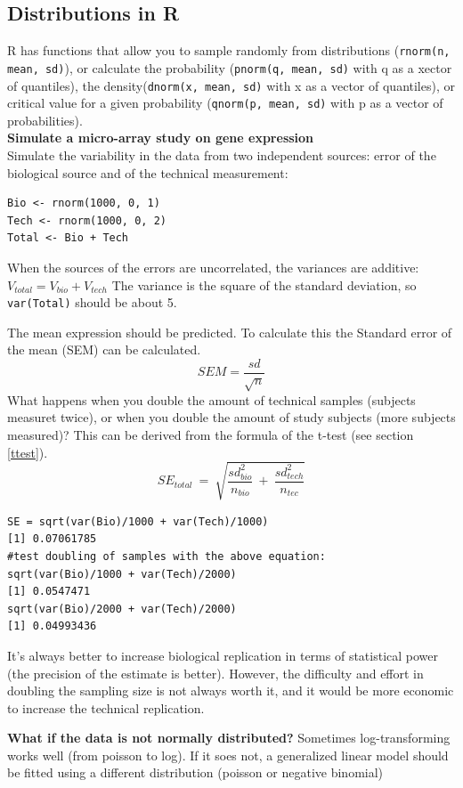 \documentclass{article}
\begin{document}
\subsection{Distributions in R}
R has functions that allow you to sample randomly from distributions (\texttt{rnorm(n, mean, sd)}), or calculate the probability (\texttt{pnorm(q, mean, sd)} with q as a xector of quantiles), the density(\texttt{dnorm(x, mean, sd)} with x as a vector of quantiles), or critical value for a given probability (\texttt{qnorm(p, mean, sd)} with p as a vector of probabilities).\\
\textbf{Simulate a micro-array study on gene expression}\\
Simulate the variability in the data from two independent sources: error of the biological source and of the technical measurement:
\begin{lstlisting}
Bio <- rnorm(1000, 0, 1)
Tech <- rnorm(1000, 0, 2)
Total <- Bio + Tech
\end{lstlisting}
When the sources of the errors are uncorrelated, the variances are additive: $V_{total} = V_{bio} +V_{tech}$
The variance is the square of the standard deviation, so \texttt{var(Total)} should be about 5.\par
The mean expression should be predicted. To calculate this the Standard error of the mean (SEM) can be calculated. $$SEM = \frac{sd}{\sqrt{n}}$$
What happens when you double the amount of technical samples (subjects measuret twice), or when you double the amount of study subjects (more subjects measured)? This can be derived from the formula of the t-test (see section \ref{ttest}). 
$$SE_{total}\: = \:\sqrt{\frac{sd_{bio}^2}{n_{bio}} \: + \: \frac{sd_{tech}^2}{n_{tec}}} $$
\begin{lstlisting}
SE = sqrt(var(Bio)/1000 + var(Tech)/1000)
[1] 0.07061785
#test doubling of samples with the above equation:
sqrt(var(Bio)/1000 + var(Tech)/2000)
[1] 0.0547471
sqrt(var(Bio)/2000 + var(Tech)/2000)
[1] 0.04993436
\end{lstlisting}
It's always better to increase biological replication in terms of statistical power (the precision of the estimate is better). However, the difficulty and effort in doubling the sampling size is not always worth it, and it would be more economic to increase the technical replication.\par
\textbf{What if the data is not normally distributed?} Sometimes log-transforming works well (from poisson to log). If it soes not, a generalized linear model should be fitted using a different distribution (poisson or negative binomial)
\end{document}
